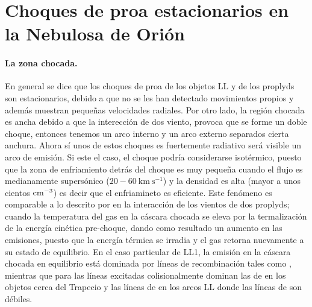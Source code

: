 \section{Choques de proa estacionarios en la Nebulosa de Orión}
\label{sec:shocks}

\paragraph{La zona chocada.} En general se dice que los choques de proa de los objetos LL y de los proplyds son estacionarios, debido a que no se les han detectado movimientos propios y además muestran pequeñas velocidades radiales. Por otro lado, la región chocada es ancha debido a que la interección de dos viento, provoca que se forme un doble choque, entonces tenemos un arco interno y un arco externo separados cierta anchura. Ahora sí unos de estos choques es fuertemente radiativo será visible un arco de emisión. Si este el caso, el choque podría considerarse isotérmico, puesto que la zona de enfriamiento detrás del choque es muy pequeña cuando el flujo es medianamente supersónico (\(20-60~\text{km}~\text{s}^{-1}\)) y la densidad es alta (mayor a unos cientos \(\mathrm{cm}^{-3}\)) es decir que el enfriamineto es eficiente. Este fenómeno es comparable a lo descrito por \citet{Henney:2002} en la interacción de los vientos de dos proplyds; cuando la temperatura del gas en la cáscara chocada se eleva por la termalización de la energía cinética pre-choque, dando como resultado un aumento en las emisiones, puesto que la energía térmica se irradia y el gas retorna nuevamente a su estado de equilibrio. En el caso particular de LL1, la emisión en la cáscara chocada en equilibrio está dominada por líneas de recombinación tales como \ha{}, mientras que para las líneas excitadas colisionalmente dominan las de \oiii{} en los objetos cerca del Trapecio y las líneas de \nii{} en los arcos LL donde las líneas de \oiii{} son débiles.\\ 

